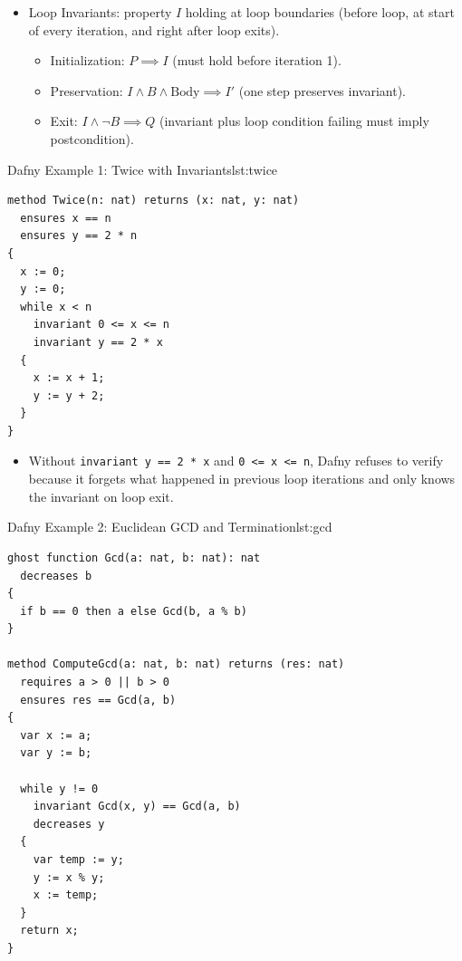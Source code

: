 \begin{itemize}
    \item Loop Invariants: property $I$ holding at loop boundaries (before loop, at start of every iteration, and right after loop exits).
    \begin{itemize}
        \item Initialization: $P \implies I$ (must hold before iteration 1).
        \item Preservation: $I \land B \land \text{Body} \implies I'$ (one step preserves invariant).
        \item Exit: $I \land \neg B \implies Q$ (invariant plus loop condition failing must imply postcondition).
    \end{itemize}
\end{itemize}

\begin{ppprogram}{Dafny Example 1: Twice with Invariants}{lst:twice}
\begin{lstlisting}
method Twice(n: nat) returns (x: nat, y: nat)
  ensures x == n
  ensures y == 2 * n
{
  x := 0;
  y := 0;
  while x < n
    invariant 0 <= x <= n
    invariant y == 2 * x
  {
    x := x + 1;
    y := y + 2;
  }
}
\end{lstlisting}
\end{ppprogram}

\begin{itemize}
    \item Without \texttt{invariant y == 2 * x} and \texttt{0 <= x <= n}, Dafny refuses to verify because it forgets what happened in previous loop iterations and only knows the invariant on loop exit.
\end{itemize}

\begin{ppprogram}{Dafny Example 2: Euclidean GCD and Termination}{lst:gcd}
\begin{lstlisting}
ghost function Gcd(a: nat, b: nat): nat
  decreases b
{
  if b == 0 then a else Gcd(b, a % b)
}

method ComputeGcd(a: nat, b: nat) returns (res: nat)
  requires a > 0 || b > 0
  ensures res == Gcd(a, b)
{
  var x := a;
  var y := b;

  while y != 0
    invariant Gcd(x, y) == Gcd(a, b)
    decreases y
  {
    var temp := y;
    y := x % y;
    x := temp;
  }
  return x;
}
\end{lstlisting}
\end{ppprogram}

